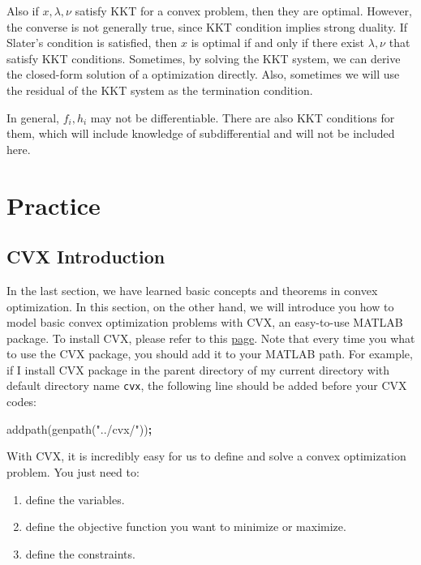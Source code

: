 \documentclass[
]{book}
\newenvironment{Shaded}{\begin{snugshade}}{\end{snugshade}}
\newcommand{\NormalTok}[1]{#1}
\newcommand{\OperatorTok}[1]{\textcolor[rgb]{0.81,0.36,0.00}{\textbf{#1}}}
\newcommand{\StringTok}[1]{\textcolor[rgb]{0.31,0.60,0.02}{#1}}
\newcommand{\VariableTok}[1]{\textcolor[rgb]{0.00,0.00,0.00}{#1}}
\theoremstyle{definition}
\theoremstyle{definition}
\theoremstyle{definition}
\theoremstyle{definition}
\theoremstyle{remark}
\begin{document}
Also if \(x,\lambda,\nu\) satisfy KKT for a convex problem, then they are optimal. However, the converse is not generally true, since KKT condition implies strong duality. If Slater's condition is satisfied, then \(x\) is optimal if and only if there exist \(\lambda,\nu\) that satisfy KKT conditions. Sometimes, by solving the KKT system, we can derive the closed-form solution of a optimization directly. Also, sometimes we will use the residual of the KKT system as the termination condition.

In general, \(f_i,h_i\) may not be differentiable. There are also KKT conditions for them, which will include knowledge of subdifferential and will not be included here.

\section{Practice}\label{appconvex-practice}

\subsection{CVX Introduction}\label{cvx-introduction}

In the last section, we have learned basic concepts and theorems in convex optimization. In this section, on the other hand, we will introduce you how to model basic convex optimization problems with CVX, an easy-to-use MATLAB package. To install CVX, please refer to this \href{http://cvxr.com/cvx/doc/install.html}{page}. Note that every time you what to use the CVX package, you should add it to your MATLAB path. For example, if I install CVX package in the parent directory of my current directory with default directory name \texttt{cvx}, the following line should be added before your CVX codes:

\begin{Shaded}
\begin{Highlighting}[]
\VariableTok{addpath}\NormalTok{(}\VariableTok{genpath}\NormalTok{(}\StringTok{"../cvx/"}\NormalTok{))}\OperatorTok{;}
\end{Highlighting}
\end{Shaded}

With CVX, it is incredibly easy for us to define and solve a convex optimization problem. You just need to:

\begin{enumerate}
\def\labelenumi{\arabic{enumi}.}
\item
  define the variables.
\item
  define the objective function you want to minimize or maximize.
\item
  define the constraints.
\end{enumerate}
\end{document}
